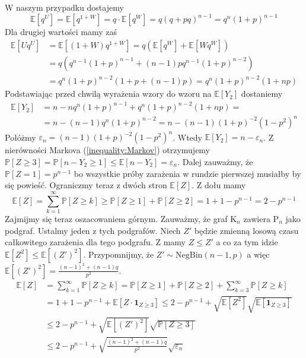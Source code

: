 W naszym przypadku dostajemy 
\[
    \mathbb{E}[q^U]=\mathbb{E}[q^{1+W}]=q\cdot \mathbb{E}[q^W]=q{(q+pq)}^{n-1}=q^n{(1+p)}^{n-1}
\]
Dla drugiej wartości mamy zaś
\begin{equation*}
\begin{aligned}
\mathbb{E}[Uq^U] 
&= \mathbb{E}[(1+W)q^{1+W}] = q(\mathbb{E}[q^W]+\mathbb{E}[Wq^W]) \\
& = q(q^{n-1}{(1+p)}^{n-1}+(n-1)pq^{n-1}{(1+p)}^{n-2}) \\
&= q^n{(1+p)}^{n-2}(1+p+(n-1)p)=q^n{(1+p)}^{n-2}(1+np)
\end{aligned}
\end{equation*}
Podstawiając przed chwilą wyrażenia wzory do wzoru na $\mathbb{E}[Y_2]$ dostaniemy
\begin{equation*}
\begin{aligned}
\mathbb{E}[Y_2] 
&= n-nq^n{(1+p)}^{n-1}+q^n{(1+p)}^{n-2}(1+np)= \\
&= n-(n-1)q^n{(1+p)}^{n-2}=n-(n-1){(1+p)}^{-2}{(1-p^2)}^n
\end{aligned}
\end{equation*}
Połóżmy $\varepsilon_n=(n-1){(1+p)}^{-2}{(1-p^2)}^n$. Wtedy $\mathbb{E}[Y_2]=n-\varepsilon_n$. Z nierówności Markova (\ref{inequality:Markov}) otrzymujemy $\mathbb{P}[Z\ge 3]=\mathbb{P}[n-Y_2\ge 1]\le \mathbb{E}[n-Y_2]=\varepsilon_n$. Dalej zauważmy, że $\mathbb{P}[Z=1]=p^{n-1}$ bo wszystkie próby zarażenia w rundzie pierwszej musiałby by się powieść. Ograniczmy teraz z dwóch stron $\mathbb{E}[Z]$. Z dołu mamy
\[
    \mathbb{E}[Z]=\sum_{k=1}^{\infty}\mathbb{P}[Z\ge k] \ge \mathbb{P}[Z\ge 1] + \mathbb{P}[Z\ge 2] = 1 + 1 - p^{n-1} = 2 - p^{n-1}
\]
Zajmijmy się teraz oszacowaniem górnym. Zauważmy, że graf $\mathrm{K}_n$ zawiera $\mathrm{P}_n$ jako podgraf. Ustalmy jeden z tych podgrafów. Niech $Z'$ będzie zmienną losową czasu całkowitego zarażenia dla tego podgrafu. Z  mamy $Z\le Z'$ a co za tym idzie $\mathbb{E}[Z^2] \le \mathbb{E}[{(Z')}^2]$. Przypomnijmy, że $Z' \sim \mathrm{NegBin}(n-1,p)$ a więc $\mathbb{E}[{(Z')}^2]=\frac{{(n-1)}^2+(n-1)q}{p^2}$. 
\begin{equation*}
\begin{aligned}
\mathbb{E}[Z] 
&= \sum_{k=1}^{\infty}\mathbb{P}[Z\ge k] = \mathbb{P}[Z\ge 1] + \mathbb{P}[Z\ge 2] + \sum_{k = 3}^{\infty} \mathbb{P}[Z\ge k]  \\
&= 1 + 1-p^{n-1} + \mathbb{E}[Z \cdot \mathbf{1}_{Z\ge 3}] \le 2 - p^{n-1} + \sqrt{\mathbb{E}[Z^2]}\sqrt{\mathbb{E}[\mathbf{1}_{Z\ge 3}]} \\
&\le 2 - p^{n-1} + \sqrt{\mathbb{E}[{(Z')}^2]}\sqrt{\mathbb{P}[Z\ge 3]} \\
&\le 2 - p^{n-1} + \sqrt{\frac{{(n-1)}^2+(n-1)q}{p^2}}\sqrt{\varepsilon_n}
\end{aligned}
\end{equation*}
